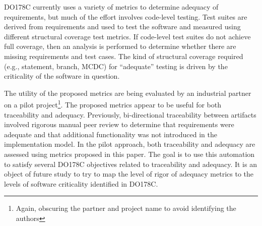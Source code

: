 DO178C currently uses a variety of metrics to determine adequacy of requirements, but much of the effort involves code-level testing.  Test suites are derived from requirements and used to test the software and measured using different structural coverage test metrics.  If code-level test suites do not achieve full coverage, then an analysis is performed to determine whether there are missing requirements and test cases.  The kind of structural coverage required (e.g., statement, branch, MCDC) for ``adequate'' testing is driven by the criticality of the software in question.

The utility of the proposed metrics are being evaluated by an industrial partner on a pilot project\footnote{Again, obscuring the partner and project name to avoid identifying the authors}.  The proposed metrics appear to be useful for both traceability and adequacy.  Previously, bi-directional traceability between artifacts involved rigorous manual peer review to determine that requirements were adequate and that additional functionality was not introduced in the implementation model.  In the pilot approach, both traceability and adequacy are assessed using metrics proposed in this paper.  The goal is to use this automation to satisfy several DO178C objectives related to traceability and adequacy.  It is an object of future study to try to map the level of rigor of adequacy metrics to the levels of software criticality identified in DO178C.


